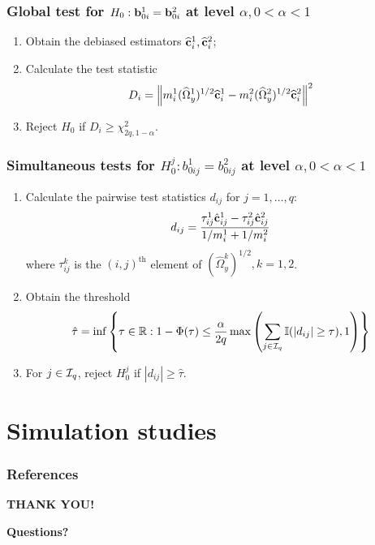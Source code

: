 \documentclass[10pt]{beamer}
\theoremstyle{definition}
\newcommand{\colubf}{\color{UniBlue}\bf}
\DeclareMathOperator*{\Th}{\text{th}}
\begin{document}
\begin{frame}
\frametitle{Global test for $H_0: {\bf{b}}_{0 i}^1 = {\bf{b}}_{0 i}^2$ at level $\alpha, 0< \alpha< 1$}
\begin{enumerate}
\item Obtain the debiased estimators $\widehat {{\bf{c}}}_i^1, \widehat {{\bf{c}}}_i^2$;

\item Calculate the test statistic
%
$$
D_i = \left\| m_i^1 (\widehat \Omega_y^1)^{1/2} \widehat {{\bf{c}}}_i^1 - 
 m_i^2 (\widehat \Omega_y^2)^{1/2} \widehat {{\bf{c}}}_i^2 \right\|^2
$$
%

\item Reject $H_0$ if $D_i \geq \chi^2_{2q, 1-\alpha}$.
\end{enumerate}
\end{frame}

\begin{frame}
\frametitle{Simultaneous tests for $H_0^{j}: b_{0 ij}^1 = b_{0 ij}^2$ at level $\alpha, 0< \alpha< 1$}

\begin{enumerate}
\item Calculate the pairwise test statistics $d_{ij}$ for $j = 1, \ldots, q$:
%
\[
d_{ij} = \frac{\tau_{ij}^1 \hat {{\bf{c}}}_{ij}^1 - \tau_{ij}^2 \hat {{\bf{c}}}_{ij}^2}{1/m_i^1 + 1/m_i^2}
\]
%
where $\tau_{ij}^k$ is the $(i,j)^{\Th}$ element of $(\widehat \Omega_y^k)^{1/2}, k=1,2$.

\item Obtain the threshold
%
$$
\hat \tau = \inf \left\{\tau \in {\mathbb{R}}: 1 - \Phi(\tau) \leq \frac{\alpha}{2 q}
\max \left( \sum_{j \in {\cal{I}}_q} {\mathbb{I}}( |d_{ij}| \geq \tau), 1 \right) \right\}
$$
%

\item For $j \in {\cal{I}}_q$, reject $H_0^{j}$ if $|d_{ij}| \geq \hat \tau$.
\end{enumerate} 

\end{frame}
\section{Simulation studies}

\begin{frame}
\frametitle{References}
{\scriptsize


}
\end{frame}


\begin{frame}
\centering
{\huge\textcolor{UniBlue}{\textbf{THANK YOU!}}}\\

\vspace{2em}

\vspace{1em}
{\colubf Questions?}
\end{frame}
\end{document}
